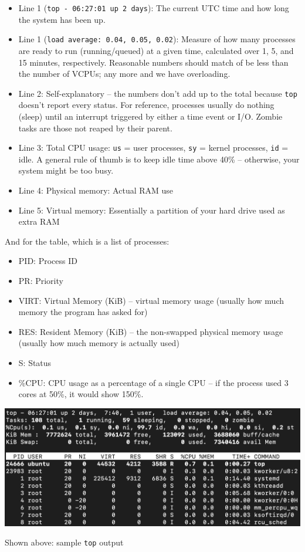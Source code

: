 \documentclass{report}
\newcommand{\npar}{\par\noindent}
\begin{document}
\begin{itemize}
    \item Line 1 (\verb|top - 06:27:01 up 2 days|): The current UTC time and how long the system has been up.
    \item Line 1 (\verb|load average: 0.04, 0.05, 0.02|): Measure of how many processes are ready to run (running/queued) at a given time, calculated over 1, 5, and 15 minutes, respectively. Reasonable numbers should match of be less than the number of VCPUs; any more and we have overloading.
    \item Line 2: Self-explanatory -- the numbers don't add up to the total because \verb|top| doesn't report every status. For reference, processes usually do nothing (sleep) until an interrupt triggered by either a time event or I/O. Zombie tasks are those not reaped by their parent.
    \item Line 3: Total CPU usage: \verb|us| = user processes, \verb|sy| = kernel processes, \verb|id| = idle. A general rule of thumb is to keep idle time above 40\% -- otherwise, your system might be too busy.
    \item Line 4: Physical memory: Actual RAM use
    \item Line 5: Virtual memory: Essentially a partition of your hard drive used as extra RAM
\end{itemize}

\npar And for the table, which is a list of processes:

\begin{itemize}
    \item PID: Process ID
    \item PR: Priority
    \item VIRT: Virtual Memory (KiB) -- virtual memory usage (usually how much memory the program has asked for)
    \item RES: Resident Memory (KiB) -- the non-swapped physical memory usage (usually how much memory is actually used)
    \item S: Status
    \item \%CPU: CPU usage as a percentage of a single CPU -- if the process used 3 cores at 50\%, it would show 150\%.
\end{itemize}

\begin{center}
    \includegraphics[scale=0.60]{10-2.png}
    \par Shown above: sample \verb|top| output
\end{center}
\end{document}
